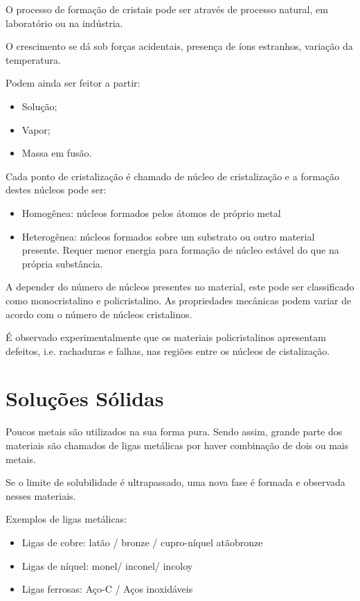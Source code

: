 O processo de formação de cristais pode ser através de processo natural, em laboratório ou na indústria.

O crescimento se dá sob forças acidentais, presença de íons estranhos, variação da temperatura.

Podem ainda ser feitor a partir:

\begin{itemize}
	\item Solução;
	\item Vapor;
	\item Massa em fusão.
\end{itemize}


Cada ponto de cristalização é chamado de núcleo de cristalização e a formação destes núcleos pode ser:

\begin{itemize}
	\item Homogênea: núcleos formados pelos átomos de próprio metal 
	\item Heterogênea: núcleos formados sobre um substrato ou outro material presente. Requer menor energia para formação de núcleo estável do que na própria substância.
\end{itemize}

A depender do número de núcleos presentes no material, este pode ser classificado como monocristalino e policristalino. As propriedades mecânicas podem variar de acordo com o número de núcleos cristalinos.

É observado experimentalmente que os materiais policristalinos apresentam defeitos, i.e. rachaduras e falhas, nas regiões entre os núcleos de cistalização.


\section{Soluções Sólidas}

Poucos metais são utilizados na sua forma pura. Sendo assim, grande parte dos materiais são chamados de ligas metálicas por haver combinação de dois ou mais metais.

Se o limite de solubilidade é ultrapassado, uma nova fase é formada e observada nesses materiais.

Exemplos de ligas metálicas:

\begin{itemize}
	\item Ligas de cobre: latão / bronze / cupro-níquel atãobronze
	\item Ligas de níquel: monel/ inconel/ incoloy
	\item Ligas ferrosas: Aço-C / Aços inoxidáveis
\end{itemize}

